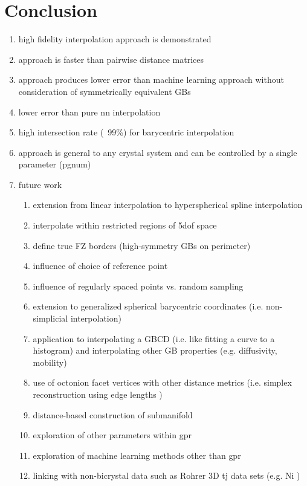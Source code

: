 \section{Conclusion} \label{sec:conclusion}

\begin{enumerate}
    \item high fidelity interpolation approach is demonstrated
    \item approach is faster than pairwise distance matrices
    \item approach produces lower error than machine learning approach without consideration of symmetrically equivalent GBs
    \item lower error than pure \gls{nn} interpolation
    \item high intersection rate (~99\%) for barycentric interpolation
    \item approach is general to any crystal system and can be controlled by a single parameter (pgnum)
    \item future work
    \begin{enumerate}
        \item extension from linear interpolation to hyperspherical spline interpolation \cite{Taijeron1994SplineHyperspheres}
        \item interpolate within restricted regions of \gls{5dof} space
        \item define true FZ borders (high-symmetry GBs on perimeter)
        \item influence of choice of reference point
        \item influence of regularly spaced points vs. random sampling
        \item extension to generalized spherical barycentric coordinates (i.e. non-simplicial interpolation) \cite{Langer2006SphericalCoordinates}
        \item application to interpolating a GBCD (i.e. like fitting a curve to a histogram) and interpolating other GB properties (e.g. diffusivity, mobility)
        \item use of octonion facet vertices with other distance metrics (i.e. simplex reconstruction using edge lengths \cite{Connor2017High-dimensionalSearch})
        \item distance-based construction of submanifold \cite{Boissonnat2017OnlySubmanifolds}
        \item exploration of other parameters within \gls{gpr}
        \item exploration of machine learning methods other than \gls{gpr}
        \item linking with non-bicrystal data such as Rohrer 3D \gls{tj} data sets (e.g. Ni \cite{Li2009RelativeNickel})
    \end{enumerate}
\end{enumerate}


